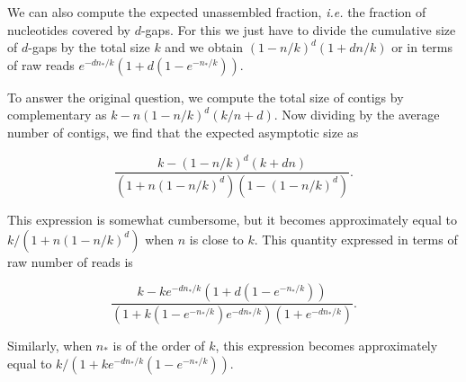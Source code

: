 \documentclass{article}
\begin{document}
We can also compute the expected unassembled fraction, \textit{i.e.} the
fraction of nucleotides covered by $d$-gaps. For this we just have to
divide the cumulative size of $d$-gaps by the total size $k$ and we obtain
$(1-n/k)^d(1+dn/k)$ or in terms of raw reads
$e^{-dn_*/k}(1+d(1-e^{-n_*/k}))$.

To answer the original question, we compute the total size of contigs by
complementary as $k-n(1-n/k)^d(k/n+d)$. Now dividing by the
average number of contigs, we find that the expected asymptotic size as

\begin{equation}
\frac{k-(1-n/k)^d(k+dn)}
{\left(1+n(1-n/k)^d\right)\left(1-(1-n/k)^d \right)}.
\end{equation}

This expression is somewhat cumbersome, but it becomes approximately equal
to $k/(1+n(1-n/k)^d)$ when $n$ is close to $k$. This quantity expressed in
terms of raw number of reads is

\begin{equation}
\frac{k-ke^{-dn_*/k}(1+d(1-e^{-n_*/k}))}{( 1 + k(1-e^{-n_*/k})e^{-dn_*/k}
) (1+e^{-dn_*/k})}.
\end{equation}

Similarly, when $n_*$ is of the order of $k$, this expression becomes
approximately equal to $k/(1+ke^{-dn_*/k}(1-e^{-n_*/k}))$.





\end{document}

